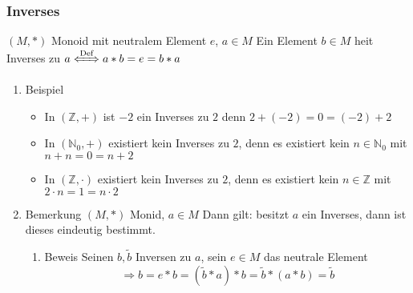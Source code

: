 \documentclass[11pt]{article}
\begin{document}
\subsubsection{Inverses}
\label{sec-3-1-3}
$(M,*)$ Monoid mit neutralem Element $e$, $a\in M$
Ein Element $b\in M$ heit Inverses zu $a \xLeftrightarrow{\text{Def}} a * b = e = b * a$
\begin{enumerate}
\item Beispiel
\label{sec-3-1-3-1}
\begin{itemize}
\item In $(\mathbb{Z},+)$ ist $-2$ ein Inverses zu $2$ denn $2 + (-2) = 0 = (-2) + 2$
\item In $(\mathbb{N}_0,+)$ existiert kein Inverses zu $2$, denn es existiert kein $n\in \mathbb{N}_0$ mit $n + n = 0 = n + 2$
\item \label{invex} In $(\mathbb{Z},\cdot)$ existiert kein Inverses zu $2$, denn es existiert kein $n\in\mathbb{Z}$ mit $2\cdot n = 1 = n \cdot 2$
\end{itemize}
\item Bemerkung
\label{sec-3-1-3-2}
\label{beminv}
$(M,*)$ Monid, $a\in M$ Dann gilt: besitzt $a$ ein Inverses, dann ist dieses eindeutig bestimmt.
\begin{enumerate}
\item Beweis
\label{sec-3-1-3-2-1}
Seinen $b,\tilde b$ Inversen zu $a$, sein $e\in M$ das neutrale Element
\[\Rightarrow b = e * b = (\tilde b * a) * b = \tilde b * (a * b) = \tilde b\]
\end{enumerate}
\end{enumerate}
\end{document}
